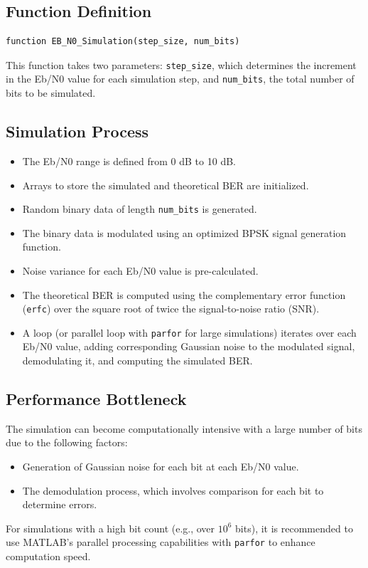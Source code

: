 \documentclass[11pt]{article}
\begin{document}
\subsection*{Function Definition}
\begin{verbatim}
function EB_N0_Simulation(step_size, num_bits)
\end{verbatim}
This function takes two parameters: \texttt{step\_size}, which determines the increment in the Eb/N0 value for each simulation step, and \texttt{num\_bits}, the total number of bits to be simulated.

\subsection*{Simulation Process}
\begin{itemize}
    \item The Eb/N0 range is defined from 0 dB to 10 dB.
    \item Arrays to store the simulated and theoretical BER are initialized.
    \item Random binary data of length \texttt{num\_bits} is generated.
    \item The binary data is modulated using an optimized BPSK signal generation function.
    \item Noise variance for each Eb/N0 value is pre-calculated.
    \item The theoretical BER is computed using the complementary error function (\texttt{erfc}) over the square root of twice the signal-to-noise ratio (SNR).
    \item A loop (or parallel loop with \texttt{parfor} for large simulations) iterates over each Eb/N0 value, adding corresponding Gaussian noise to the modulated signal, demodulating it, and computing the simulated BER.
\end{itemize}

\subsection*{Performance Bottleneck}
The simulation can become computationally intensive with a large number of bits due to the following factors:
\begin{itemize}
    \item Generation of Gaussian noise for each bit at each Eb/N0 value.
    \item The demodulation process, which involves comparison for each bit to determine errors.
\end{itemize}
For simulations with a high bit count (e.g., over $10^6$ bits), it is recommended to use MATLAB's parallel processing capabilities with \texttt{parfor} to enhance computation speed.
\end{document}
